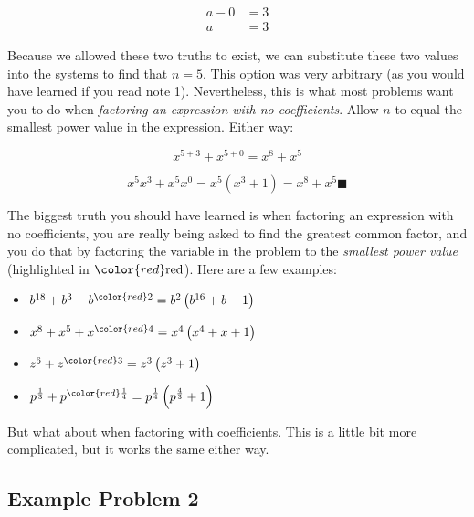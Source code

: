 \begin{align} a - 0 & = 3 \\ a & = 3 \end{align}





Because we allowed these two truths to exist, we can substitute these two values into the
systems to find that $n=5$. This option was very arbitrary (as you would have learned if
you read note 1). Nevertheless, this is what most problems want you to do when
\textit{factoring an expression with no coefficients}. Allow $n$ to equal the smallest
power value in the expression. Either way:



$$x^{5+3}+x^{5+0}=x^8+x^5$$



$$x^{5}x^{3}+x^{5}x^{0}=x^{5}\left(x^{3}+1\right)=x^8+x^5\blacksquare$$



The biggest truth you should have learned is when factoring an expression with no
coefficients, you are really being asked to find the greatest common factor, and you do
that by factoring the variable in the problem to the \textit{smallest power value}
(highlighted in ${\color{red}\text{red}}$). Here are a few examples:



\begin{itemize}
    \item $b^{18}+b^{3}-b^{{\color{red}2}}=b^{2}\left(b^{16}+b-1\right)$
    \item $x^{8}+x^{5}+x^{{\color{red}4}}=x^{4}\left(x^{4}+x+1\right)$
    \item $z^{6}+z^{{\color{red}3}}=z^{3}\left(z^{3}+1\right)$
    \item $p^{\frac{1}{3}}+p^{{\color{red}\frac{1}{4}}}=p^{\frac{1}{4}}\left(p^{\frac{4}{3}}+1\right)$
\end{itemize}

But what about when factoring with coefficients. This is a little bit more complicated,
but it works the same either way.




\subsection{Example Problem 2}
\label{sss:exam-ec9c}




